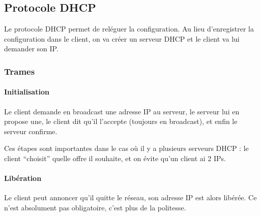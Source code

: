 \documentclass[10pt,a4paper,french]{article}
\begin{document}
\subsection{Protocole DHCP}

Le protocole DHCP permet de reléguer la configuration. Au lieu d'enregistrer la configuration dans le client, on va créer un serveur DHCP et le client va lui demander son IP.

\subsubsection{Trames}

\paragraph{Initialisation}

Le client demande en broadcast une adresse IP au serveur, le serveur lui en propose une, le client dit qu'il l'accepte (toujours en broadcast), et enfin le serveur confirme.

Ces étapes sont importantes dans le cas où il y a plusieurs serveurs DHCP : le client ``choisit'' quelle offre il souhaite, et on évite qu'un client ai 2 IPs.

\begin{center}
\begin{sequencediagram}
	
\end{sequencediagram}
\end{center}

\paragraph{Libération}

Le client peut annoncer qu'il quitte le réseau, son adresse IP est alors libérée. Ce n'est absolument pas obligatoire, c'est plus de la politesse.

\begin{center}
\begin{sequencediagram}
	
\end{sequencediagram}
\end{center}
\end{document}
